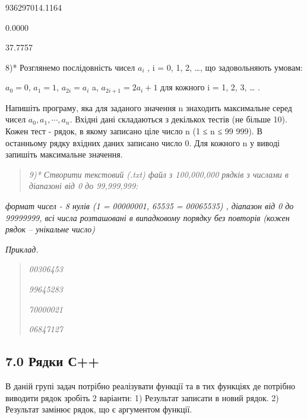 \documentclass[]{article}
\begin{document}
936297014.1164

0.0000

37.7757

8)* \protect\hypertarget{_Hlk65238487}{}{}Розглянемо послідовність чисел
\(a_{i}\) , i = 0, 1, 2, \ldots{}, що задовольняють умовам:

\(a_{0} = 0\), \(a_{1} = 1\), \(a_{2i} = a_{i}\) a,
\(a_{2i + 1} = {2a}_{i} + 1\) для кожного i = 1, 2, 3, \ldots{} .

Напишіть програму, яка для заданого значення n знаходить максимальне
серед чисел \(a_{0},a_{1},\cdots,a_{n}\). Вхідні дані складаються з
декількох тестів (не більше 10). Кожен тест - рядок, в якому записано
ціле число n (1 ≤ n ≤ 99 999). В останньому рядку вхідних даних записано
число 0. Для кожного n у виводі запишіть максимальне значення.

\begin{quote}
\emph{9)* Створити текстовий (.txt) файл з 100,000,000 рядків з числами
в діапазоні від 0 до 99,999,999:}
\end{quote}

\emph{формат чисел - 8 нулів (1 = 00000001, 65535 = 00065535) , діапазон
від 0 до 99999999, всі числа розташовані в випадковому порядку без
повторів (кожен рядок -- унікальне число)}

\emph{Приклад.}

\begin{quote}
\emph{00306453 }

\emph{99645283 }

\emph{70000021 }

\emph{06847127 }
\end{quote}

\subsection{7.0 Рядки С++}\label{ux440ux44fux434ux43aux438-ux441}

В даній групі задач потрібно реалізувати функції та в тих функціях де
потрібно виводити рядок зробіть 2 варіанти: 1) Результат записати в
новий рядок. 2) Результат замінює рядок, що є аргументом функції.
\end{document}
